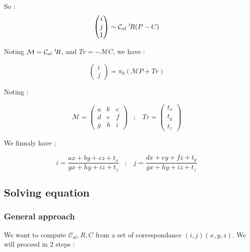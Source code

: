 So :
\begin{equation}
	   \begin{pmatrix} i \\ j \\ 1\end{pmatrix}
		   \sim \mathcal{C}_{al}  \; ^{t} \! R  (P-C)
\end{equation}

Noting $  \mathcal{M} =  \mathcal{C}_{al}  \; ^{t} \! R $, and $Tr = -\mathcal{M} C$, we have :

\begin{equation}
	\begin{pmatrix} i \\ j \end{pmatrix} = \pi_0 ( \mathcal{M} P + Tr )
\end{equation}

Noting :

\begin{equation}
	\mathcal{M}   =  \begin{pmatrix} a & b & c \\ d & e & f \\ g & h & i \end{pmatrix} 
   \;\;\; ; \;\;\;
	 Tr  =  \begin{pmatrix} t_x \\ t_y \\ t_z \end{pmatrix} 
\end{equation}

We finnaly have ;

\begin{equation}
	i = \frac{ax+by+cz+t_x}{gx+hy+iz+t_z}
   \;\;\; ; \;\;\;
	j = \frac{dx+ey+fz+t_y}{gx+hy+iz+t_z}
	\label{EqHomSRU}
\end{equation}


\subsection{Solving equation}

\subsubsection{General approach}

We want to compute $\mathcal{C}_{al},R,C$  from a set of correspondance $(i,j) (x,y,z)$.
We will proceed in $2$ steps :

